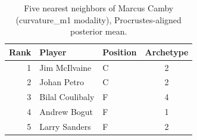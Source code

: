 \begin{table}[htbp]
  \centering\small
  \begin{tabular}{rllc}
    \toprule
    Rank & Player & Position & Archetype \\
    \midrule
    1 & Jim McIlvaine & C & 2 \\
    2 & Johan Petro & C & 2 \\
    3 & Bilal Coulibaly & F & 4 \\
    4 & Andrew Bogut & F & 1 \\
    5 & Larry Sanders & F & 2 \\
    \bottomrule
  \end{tabular}
  \caption{Five nearest neighbors of Marcus Camby (curvature_m1 modality), Procrustes-aligned posterior mean.}
  \label{tab:Marcus_Camby_neighbors_curvature_m1}
\end{table}

